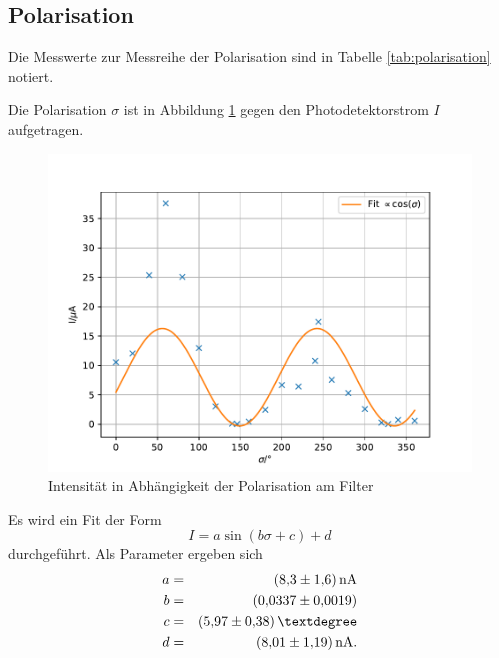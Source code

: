 \subsection{Polarisation}
Die Messwerte zur Messreihe der Polarisation sind in Tabelle \ref{tab:polarisation} notiert.

Die Polarisation $\sigma$ ist in Abbildung \ref{fig:polarisation} gegen den Photodetektorstrom $I$ aufgetragen.
\begin{figure}
  \centering
  \includegraphics[width=\textwidth]{polarisation.pdf}
  \caption{Intensität in Abhängigkeit der Polarisation am Filter}
  \label{fig:polarisation}
\end{figure}
Es wird ein Fit der Form
\begin{equation*}
  I= a \sin{(b \sigma +c)}+d
\end{equation*}
durchgeführt.
Als Parameter ergeben sich
\begin{align*}
  a &=& \SI{ 8.3 \pm 1.6 }{nA} \\
  b &=& \SI{ 0.0337 \pm 0.0019 }{} \\
  c &=& \SI{ 5.97 \pm 0.38 }{°} \\
  d &=& \SI{ 8.01 \pm 1.19 }{nA}. \\
\end{align*}
%
